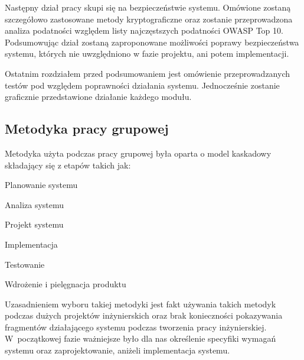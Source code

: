 Następny dział pracy skupi się na bezpieczeństwie systemu. Omówione zostaną szczegółowo zastosowane metody kryptograficzne oraz zostanie przeprowadzona analiza podatności względem listy najczęstszych podatności OWASP Top 10. Podsumowując dział zostaną zaproponowane możliwości poprawy  bezpieczeństwa systemu, których nie uwzględniono w fazie projektu, ani potem implementacji.

Ostatnim rozdziałem przed podsumowaniem jest omówienie przeprowadzanych testów pod względem poprawności działania systemu. Jednocześnie zostanie graficznie przedstawione działanie każdego modułu.

\newpage
\subsection{Metodyka pracy grupowej}
Metodyka użyta podczas pracy grupowej była oparta o model kaskadowy \cite{waterfall} składający się z etapów takich jak:
\begin{itemize*}
	\item Planowanie systemu
	\item Analiza systemu
	\item Projekt systemu
	\item Implementacja
	\item Testowanie
	\item Wdrożenie i pielęgnacja produktu
\end{itemize*}

Uzasadnieniem wyboru takiej metodyki jest fakt używania takich metodyk podczas dużych projektów inżynierskich oraz brak konieczności pokazywania fragmentów działającego systemu podczas tworzenia pracy inżynierskiej. W~początkowej fazie ważniejsze było dla nas określenie specyfiki wymagań systemu oraz zaprojektowanie, aniżeli implementacja systemu.